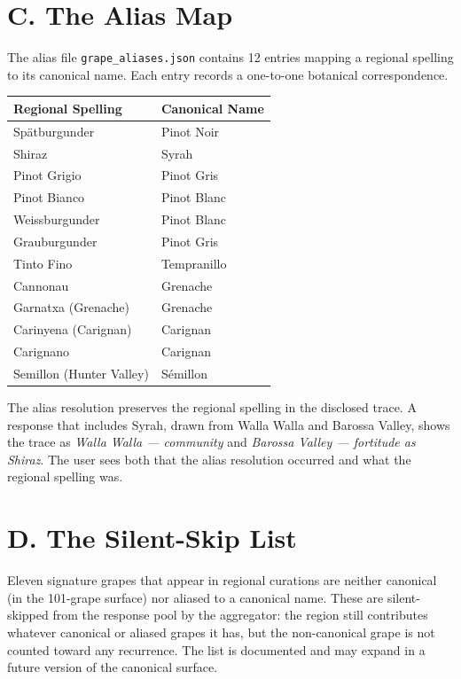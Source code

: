 \documentclass[11pt]{article}
\begin{document}
\section*{C. The Alias Map}

The alias file \texttt{grape\_aliases.json} contains 12 entries mapping a regional spelling to its canonical name. Each entry records a one-to-one botanical correspondence.

\begin{small}
\begin{longtable}{p{6cm} p{5cm}}
\toprule
\textbf{Regional Spelling} & \textbf{Canonical Name} \\
\midrule
\endhead
Spätburgunder              & Pinot Noir \\
Shiraz                     & Syrah \\
Pinot Grigio               & Pinot Gris \\
Pinot Bianco               & Pinot Blanc \\
Weissburgunder             & Pinot Blanc \\
Grauburgunder              & Pinot Gris \\
Tinto Fino                 & Tempranillo \\
Cannonau                   & Grenache \\
Garnatxa (Grenache)        & Grenache \\
Carinyena (Carignan)       & Carignan \\
Carignano                  & Carignan \\
Semillon (Hunter Valley)   & S\'emillon \\
\bottomrule
\end{longtable}
\end{small}

The alias resolution preserves the regional spelling in the disclosed trace. A response that includes Syrah, drawn from Walla Walla and Barossa Valley, shows the trace as \emph{Walla Walla --- community} and \emph{Barossa Valley --- fortitude \textperiodcentered{} as Shiraz}. The user sees both that the alias resolution occurred and what the regional spelling was.

\section*{D. The Silent-Skip List}

Eleven signature grapes that appear in regional curations are neither canonical (in the 101-grape surface) nor aliased to a canonical name. These are silent-skipped from the response pool by the aggregator: the region still contributes whatever canonical or aliased grapes it has, but the non-canonical grape is not counted toward any recurrence. The list is documented and may expand in a future version of the canonical surface.
\end{document}
